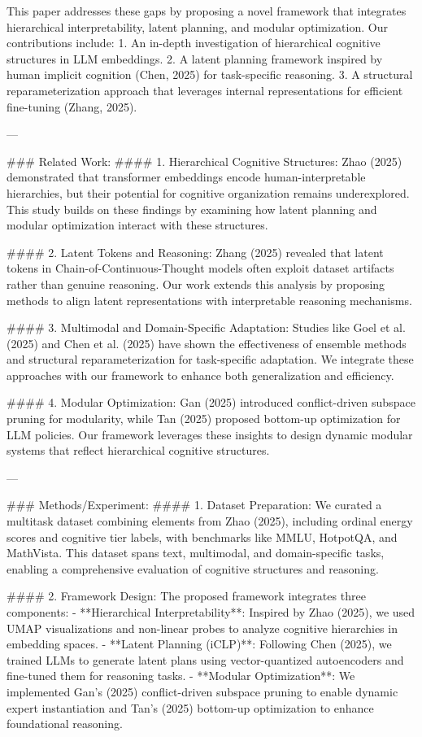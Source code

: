 This paper addresses these gaps by proposing a novel framework that integrates hierarchical interpretability, latent planning, and modular optimization. Our contributions include:
1. An in-depth investigation of hierarchical cognitive structures in LLM embeddings.
2. A latent planning framework inspired by human implicit cognition (Chen, 2025) for task-specific reasoning.
3. A structural reparameterization approach that leverages internal representations for efficient fine-tuning (Zhang, 2025).

---

### Related Work:
#### 1. Hierarchical Cognitive Structures:
Zhao (2025) demonstrated that transformer embeddings encode human-interpretable hierarchies, but their potential for cognitive organization remains underexplored. This study builds on these findings by examining how latent planning and modular optimization interact with these structures.

#### 2. Latent Tokens and Reasoning:
Zhang (2025) revealed that latent tokens in Chain-of-Continuous-Thought models often exploit dataset artifacts rather than genuine reasoning. Our work extends this analysis by proposing methods to align latent representations with interpretable reasoning mechanisms.

#### 3. Multimodal and Domain-Specific Adaptation:
Studies like Goel et al. (2025) and Chen et al. (2025) have shown the effectiveness of ensemble methods and structural reparameterization for task-specific adaptation. We integrate these approaches with our framework to enhance both generalization and efficiency.

#### 4. Modular Optimization:
Gan (2025) introduced conflict-driven subspace pruning for modularity, while Tan (2025) proposed bottom-up optimization for LLM policies. Our framework leverages these insights to design dynamic modular systems that reflect hierarchical cognitive structures.

---

### Methods/Experiment:
#### 1. Dataset Preparation:
We curated a multitask dataset combining elements from Zhao (2025), including ordinal energy scores and cognitive tier labels, with benchmarks like MMLU, HotpotQA, and MathVista. This dataset spans text, multimodal, and domain-specific tasks, enabling a comprehensive evaluation of cognitive structures and reasoning.

#### 2. Framework Design:
The proposed framework integrates three components:
- **Hierarchical Interpretability**: Inspired by Zhao (2025), we used UMAP visualizations and non-linear probes to analyze cognitive hierarchies in embedding spaces.
- **Latent Planning (iCLP)**: Following Chen (2025), we trained LLMs to generate latent plans using vector-quantized autoencoders and fine-tuned them for reasoning tasks.
- **Modular Optimization**: We implemented Gan's (2025) conflict-driven subspace pruning to enable dynamic expert instantiation and Tan's (2025) bottom-up optimization to enhance foundational reasoning.

